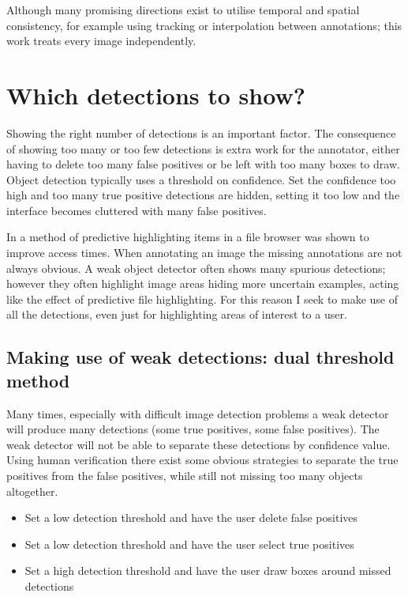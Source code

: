 Although many promising directions exist to utilise temporal and spatial consistency, for example using tracking or interpolation between annotations; this work treats every image independently. 


\section {Which detections to show?}
\label{sec:thresholding}

Showing the right number of detections is an important factor. The consequence of showing too many or too few detections is extra work for the annotator, either having to delete too many false positives or be left with too many boxes to draw. Object detection typically uses a threshold on confidence. Set the confidence too high and too many true positive detections are hidden, setting it too low and the interface becomes cluttered with many false positives.

In \cite{Fitchett2013} a method of predictive highlighting items in a file browser was shown to improve access times. When annotating an image the missing annotations are not always obvious. A weak object detector often shows many spurious detections; however they often highlight image areas hiding more uncertain examples, acting like the effect of predictive file highlighting. For this reason I seek to make use of all the detections, even just for highlighting areas of interest to a user. 

\subsection{Making use of weak detections: dual threshold method}

 Many times, especially with difficult image detection problems a weak detector will produce many detections (some true positives, some false positives). The weak detector will not be able to separate these detections by confidence value. Using human verification there exist some obvious strategies to separate the true positives from the false positives, while still not missing too many objects altogether. 

\begin{itemize}
    \item Set a low detection threshold and have the user delete false positives
    \item Set a low detection threshold and have the user select true positives
    \item Set a high detection threshold and have the user draw boxes around missed detections
\end{itemize}

